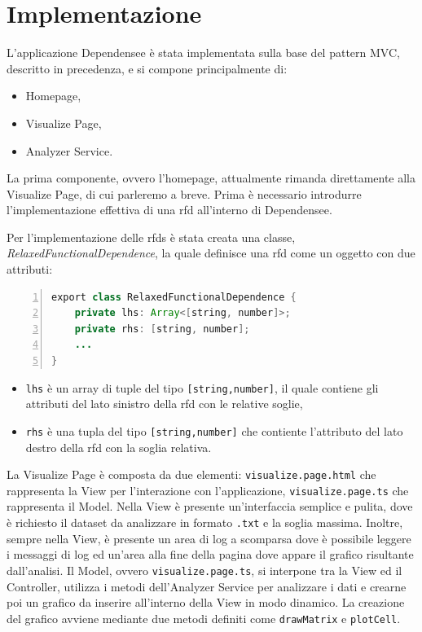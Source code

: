 \section{Implementazione}
L'applicazione Dependensee \`{e} stata implementata sulla base del pattern MVC, descritto in precedenza, e si compone principalmente di:
\begin{itemize}
    \item Homepage,
    \item Visualize Page,
    \item Analyzer Service.
\end{itemize}
La prima componente, ovvero l'homepage, attualmente rimanda direttamente alla Visualize Page, di cui parleremo a breve. Prima \`{e} necessario introdurre l'implementazione effettiva di una \acrlong{rfd} all'interno di Dependensee.\par
Per l'implementazione delle \acrshort{rfds} \`{e} stata creata una classe, \textit{RelaxedFunctionalDependence}, la quale definisce una \acrshort{rfd} come un oggetto con due attributi:
\begin{lstlisting}[language=java, numbers=left, xleftmargin=3em, captionpos=b, caption={Implementazione delle \acrshort{rfds} in Dependensee.}, frame=lines]
export class RelaxedFunctionalDependence {
    private lhs: Array<[string, number]>;
    private rhs: [string, number];
    ...
}
\end{lstlisting}
\begin{itemize}
    \item \texttt{lhs} \`{e} un array di tuple del tipo \texttt{[string,number]}, il quale contiene gli attributi del lato sinistro della \acrshort{rfd} con le relative soglie,
    \item \texttt{rhs} \`{e} una tupla del tipo \texttt{[string,number]} che contiente l'attributo del lato destro della \acrshort{rfd} con la soglia relativa.
\end{itemize}
La Visualize Page \`{e} composta da due elementi: \texttt{visualize.page.html} che rappresenta la View per l'interazione con l'applicazione, \texttt{visualize.page.ts} che rappresenta il Model. Nella View \`{e} presente un'interfaccia semplice e pulita, dove \`{e} richiesto il dataset da analizzare in formato \texttt{.txt} e la soglia massima. Inoltre, sempre nella View, \`{e} presente un area di log a scomparsa dove \`{e} possibile leggere i messaggi di log ed un'area alla fine della pagina dove appare il grafico risultante dall'analisi. Il Model, ovvero \texttt{visualize.page.ts}, si interpone tra la View ed il Controller, utilizza i metodi dell'Analyzer Service per analizzare i dati e crearne poi un grafico da inserire all'interno della View in modo dinamico. La creazione del grafico avviene mediante due metodi definiti come \texttt{drawMatrix} e \texttt{plotCell}.
